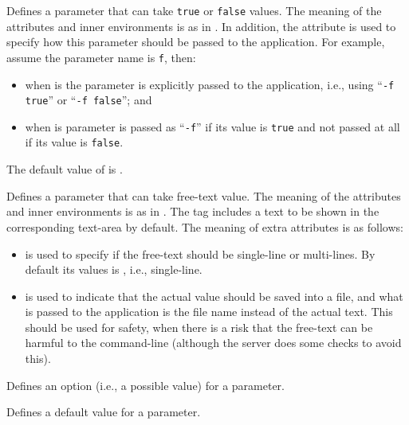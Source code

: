 \bigskip
{}
{%
%
  Defines a parameter that can take \texttt{true} or \texttt{false}
  values. The meaning of the attributes and inner environments is as
  in . In addition, the attribute
   is used to specify how this parameter
  should be passed to the application. For example, assume the
  parameter name is \texttt{f}, then:
  \begin{itemize}
  \item when  is  the
    parameter is explicitly passed to the application, i.e., using
    ``\texttt{-f true}'' or ``\texttt{-f false}''; and
  \item when  is 
    parameter is passed as ``\texttt{-f}'' if its value is
    \texttt{true} and not passed at all if its value is
    \texttt{false}.
  \end{itemize}
%
  The default value of  is
  .
%
}
{}%

\bigskip
{}
{%
%
  Defines a parameter that can take free-text value. The meaning of
  the attributes and inner environments is as in
  . The  tag includes a text
  to be shown in the corresponding text-area by default.  The meaning
  of extra attributes is as follows:
%
\begin{itemize}
%
\item {} is used to specify if the free-text
  should be single-line or multi-lines. By default its values is
  , i.e., single-line.
%
\item {} is used to indicate that the actual
  value should be saved into a file, and what is passed to the
  application is the file name instead of the actual text. 
  This should be used for safety, when there is a risk that the
  free-text can be harmful to the command-line (although the server
  does some checks to avoid this).
%
\end{itemize}
}
{}%

\bigskip
{}
{%
Defines an option (i.e., a possible value) for a parameter.
}
{}%

\bigskip
{}
{%
Defines a default value for a parameter.
}
{}%


\bigskip
\noindent
{}

